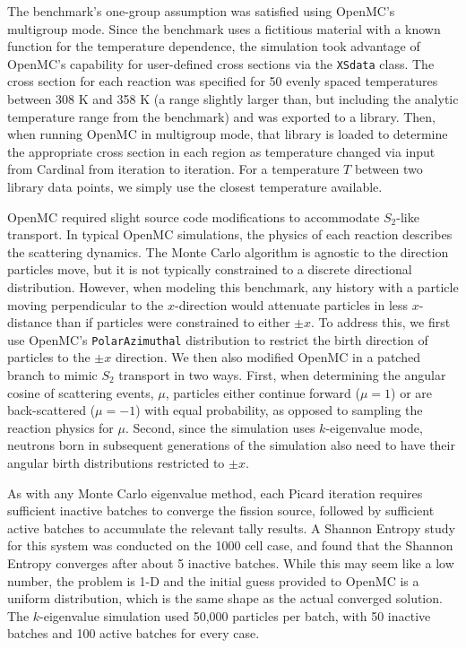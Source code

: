 \documentclass[letterpaper]{mc2023}
\begin{document}
The benchmark's one-group assumption was satisfied using OpenMC's multigroup mode. Since the benchmark uses a fictitious material
with a known function for the temperature dependence, the simulation took advantage of OpenMC's capability for user-defined
cross sections via the \texttt{XSdata} class. The cross section for each reaction was specified for 50 evenly spaced temperatures
between 308 K and 358 K (a range slightly larger than, but including the  analytic temperature range from the benchmark) and was
exported to a library. Then, when running OpenMC in multigroup mode, that library is loaded to determine the appropriate cross section
in each region as temperature changed via input from Cardinal from iteration to iteration. For a temperature $T$ between two library
data points, we simply use the closest temperature available.

OpenMC required slight source code modifications to accommodate $S_2$-like transport. In typical OpenMC simulations,
the physics of each reaction describes the scattering dynamics. The Monte Carlo algorithm is agnostic to the direction
particles move, but it is not typically constrained to a discrete directional distribution. However, when modeling this
benchmark, any history with a particle moving perpendicular to the $x$-direction would attenuate particles in less
$x$-distance than if particles were constrained to either $\pm x$. To address this, we first use OpenMC's \texttt{PolarAzimuthal}
distribution to restrict the birth direction of particles to the $\pm x$ direction. We then also modified OpenMC in a
patched branch to mimic $S_{2}$ transport in two ways. First, when determining the angular cosine of scattering events,
$\mu$, particles either continue forward ($\mu=1$) or are back-scattered ($\mu=-1$) with equal probability, as opposed to
sampling the reaction physics for $\mu$. Second, since the simulation uses $k$-eigenvalue mode, neutrons born in subsequent
generations of the simulation also need to have their angular birth distributions restricted to $\pm x$.

As with any Monte Carlo eigenvalue method, each Picard iteration requires sufficient inactive batches to converge the fission source,
followed by sufficient active batches to accumulate the relevant tally results. A Shannon Entropy \cite{brown-entropy-2006} study for
this system was conducted on the 1000 cell case, and found that the Shannon Entropy converges after about 5 inactive batches. While this
may seem like a low number, the problem is 1-D and the initial guess provided to OpenMC is a uniform distribution, which is the same
shape as the actual converged solution. The $k$-eigenvalue simulation used 50,000 particles per batch, with 50 inactive batches and
100 active batches for every case.
\end{document}
